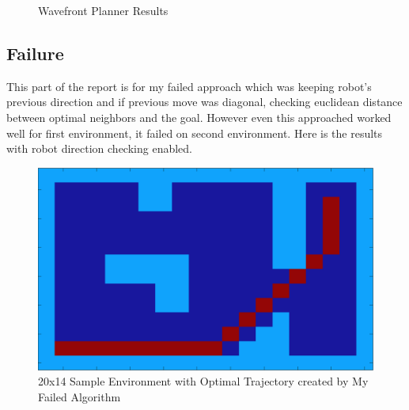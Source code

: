 \documentclass{article}
\begin{document}
\begin{figure}[ht!]
\centering
{}
\caption{Wavefront Planner Results}
\end{figure}
	
	
	\subsection{Failure}
	This part of the report is for my failed approach which was keeping robot's previous direction and if previous move was diagonal, checking euclidean distance between optimal neighbors and the goal. However even this approached worked well for first environment, it failed on second environment. Here is the results with robot direction checking enabled.
	
\begin{figure}[ht!]
\begin{center}
\includegraphics[scale=0.1]{optimalTrajectory2.png}
\caption{20x14 Sample Environment with Optimal Trajectory created by My Failed Algorithm}
\end{center}
\end{figure}
\end{document}
